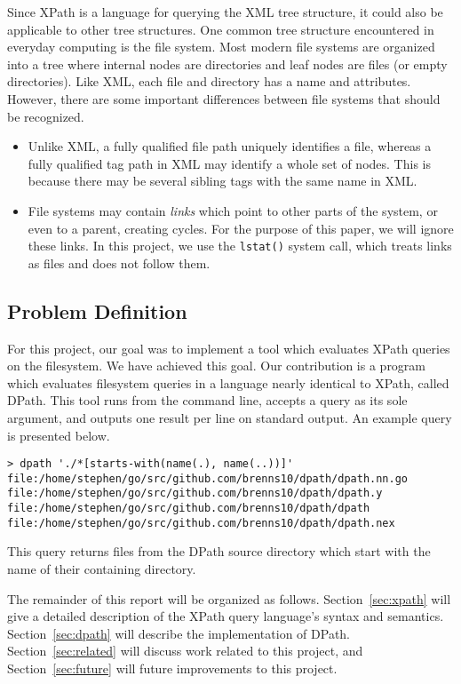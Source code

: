\documentclass{article}
\begin{document}
Since XPath is a language for querying the XML tree structure, it could also be
applicable to other tree structures. One common tree structure encountered in
everyday computing is the file system. Most modern file systems are organized
into a tree where internal nodes are directories and leaf nodes are files (or
empty directories). Like XML, each file and directory has a name and attributes.
However, there are some important differences between file systems that should
be recognized.

\begin{itemize}
\item Unlike XML, a fully qualified file path uniquely identifies a file,
  whereas a fully qualified tag path in XML may identify a whole set of nodes.
  This is because there may be several sibling tags with the same name in XML.
\item File systems may contain \emph{links} which point to other parts of the
  system, or even to a parent, creating cycles. For the purpose of this paper,
  we will ignore these links. In this project, we use the \texttt{lstat()}
  system call, which treats links as files and does not follow them.
\end{itemize}

\subsection{Problem Definition}

For this project, our goal was to implement a tool which evaluates XPath queries
on the filesystem. We have achieved this goal. Our contribution is a program
which evaluates filesystem queries in a language nearly identical to XPath,
called DPath. This tool runs from the command line, accepts a query as its sole
argument, and outputs one result per line on standard output. An example query
is presented below.

\begin{lstlisting}
> dpath './*[starts-with(name(.), name(..))]'
file:/home/stephen/go/src/github.com/brenns10/dpath/dpath.nn.go
file:/home/stephen/go/src/github.com/brenns10/dpath/dpath.y
file:/home/stephen/go/src/github.com/brenns10/dpath/dpath
file:/home/stephen/go/src/github.com/brenns10/dpath/dpath.nex
\end{lstlisting}

This query returns files from the DPath source directory which start with the
name of their containing directory.

The remainder of this report will be organized as follows.
Section~\ref{sec:xpath} will give a detailed description of the XPath query
language's syntax and semantics. Section~\ref{sec:dpath} will describe the
implementation of DPath. Section~\ref{sec:related} will discuss work related to
this project, and Section~\ref{sec:future} will future improvements to this
project.
\end{document}
